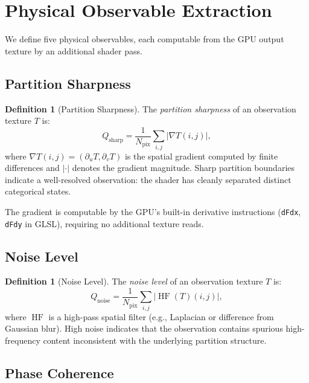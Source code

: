 \documentclass[11pt,twocolumn,a4paper]{article}
\theoremstyle{definition}
\newtheorem{definition}[theorem]{Definition}
\theoremstyle{remark}
\DeclareMathOperator{\HF}{HF}
\newcommand{\Qsharp}{Q_{\mathrm{sharp}}}
\newcommand{\Qnoise}{Q_{\mathrm{noise}}}
\newcommand{\Npix}{N_{\mathrm{pix}}}
\begin{document}
\section{Physical Observable Extraction}
\label{sec:observables}

We define five physical observables, each computable from the GPU output texture by an additional shader pass.

\subsection{Partition Sharpness}

\begin{definition}[Partition Sharpness]
\label{def:sharpness}
The \emph{partition sharpness} of an observation texture $T$ is:
\[
\Qsharp = \frac{1}{\Npix} \sum_{i,j} |\nabla T(i,j)|,
\]
where $\nabla T(i,j) = (\partial_u T, \partial_v T)$ is the spatial gradient computed by finite differences and $|\cdot|$ denotes the gradient magnitude. Sharp partition boundaries indicate a well-resolved observation: the shader has cleanly separated distinct categorical states.
\end{definition}

The gradient is computable by the GPU's built-in derivative instructions (\texttt{dFdx}, \texttt{dFdy} in GLSL), requiring no additional texture reads.

\subsection{Noise Level}

\begin{definition}[Noise Level]
\label{def:noise}
The \emph{noise level} of an observation texture $T$ is:
\[
\Qnoise = \frac{1}{\Npix} \sum_{i,j} |\HF(T)(i,j)|,
\]
where $\HF$ is a high-pass spatial filter (e.g., Laplacian or difference from Gaussian blur). High noise indicates that the observation contains spurious high-frequency content inconsistent with the underlying partition structure.
\end{definition}

\subsection{Phase Coherence}
\end{document}
